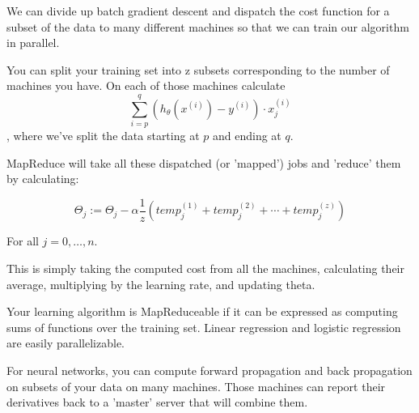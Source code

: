 \documentclass[a4paper,11pt]{report}
\begin{document}
We can divide up batch gradient descent and dispatch the cost function for a subset of the data to many different machines so that we can train our algorithm in parallel.

You can split your training set into z subsets corresponding to the number of machines you have. On each of those machines calculate $$\displaystyle \sum_{i=p}^{q}(h_{\theta}(x^{(i)}) - y^{(i)}) \cdot x_j^{(i)}$$
, where we've split the data starting at $p$ and ending at $q$.

MapReduce will take all these dispatched (or 'mapped') jobs and 'reduce' them by calculating:

$$\Theta_j := \Theta_j - \alpha \dfrac{1}{z}(temp_j^{(1)} + temp_j^{(2)} + \cdots + temp_j^{(z)})$$

For all $j = 0, \dots, n$.

This is simply taking the computed cost from all the machines, calculating their average, multiplying by the learning rate, and updating theta.

Your learning algorithm is MapReduceable if it can be expressed as computing sums of functions over the training set. Linear regression and logistic regression are easily parallelizable.

For neural networks, you can compute forward propagation and back propagation on subsets of your data on many machines. Those machines can report their derivatives back to a 'master' server that will combine them.
\end{document}
